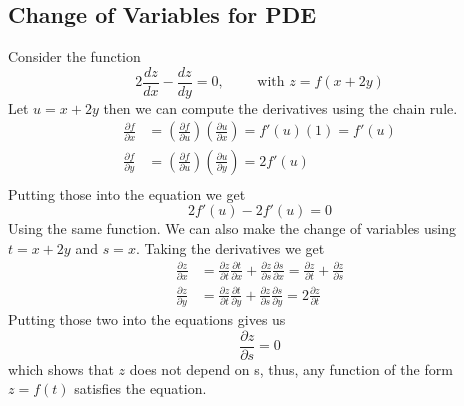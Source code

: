 \subsection{Change of Variables for PDE}
\label{subsec:Change of Variables for PDE}
\begin{exmp}
    Consider the function 
    \begin{equation}
        2 \frac{ dz }{ dx } - \frac{ dz }{ dy } = 0, \qquad \text{ with } z = f(x+2y)
        \label{eq:pde_cof_ex1}
    \end{equation}
    Let $ u = x + 2y $ then we can compute the derivatives using the chain rule. 
    \begin{align*}
        \frac{ \partial f }{ \partial x } &= \left( \frac{ \partial f }{ \partial u }
        \right) \left( \frac{ \partial u }{ \partial x } \right) = f'(u)(1) = f'(u) \\
        \frac{ \partial f }{ \partial y }  &= \left( \frac{ \partial f }{ \partial u }
        \right) \left( \frac{ \partial u }{ \partial y } \right) = 2f'(u) \\ 
    \end{align*}
   Putting those into the equation we get 
   \[
       2f'(u) - 2f'(u) = 0
   \] 
   Using the same function. We can also make the change of variables using $ t = x + 2y $
   and $ s = x $. 
   Taking the derivatives we get 
   \begin{align*}
       \frac{ \partial z }{ \partial x }  &= \frac{ \partial z }{ \partial t } \frac{
       \partial t }{ \partial x } + \frac{ \partial z }{ \partial s } \frac{ \partial s }{
   \partial x} = \frac{ \partial z }{ \partial t } + \frac{ \partial z }{ \partial s }  \\ 
   \frac{ \partial z }{ \partial y }  &= \frac{ \partial z }{ \partial t } \frac{ \partial
   t}{ \partial y } + \frac{ \partial z }{ \partial s } \frac{ \partial s }{ \partial y }
   = 2 \frac{ \partial z }{ \partial t } 
   \end{align*}
   Putting those two into the equations gives us 
   \[
     \frac{ \partial z }{ \partial s } = 0
 \] which shows that $ z $ does not depend on s, thus, any function of the form $ z = f(t)
 $ satisfies the equation. 
\end{exmp}

